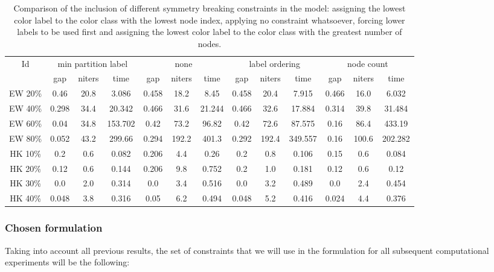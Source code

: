 \begin{sidewaystable}
\label{table:models:sym}
\centering

\begin{tabular}{|c|ccc|ccc|ccc|ccc|}
\hline
\multicolumn{1}{|c|}{Id} & \multicolumn{3}{|c|}{min partition label} & \multicolumn{3}{|c|}{none} & \multicolumn{3}{|c|}{label ordering} & \multicolumn{3}{|c|}{node count}
\\
 & gap & niters & time & gap & niters & time & gap & niters & time & gap & niters & time
\\
\hline
EW 20\% & 0.46 & 20.8 & 3.086 & 0.458 & 18.2 & 8.45 & 0.458 & 20.4 & 7.915 & 0.466 & 16.0 & 6.032
\\
EW 40\% & 0.298 & 34.4 & 20.342 & 0.466 & 31.6 & 21.244 & 0.466 & 32.6 & 17.884 & 0.314 & 39.8 & 31.484
\\
EW 60\% & 0.04 & 34.8 & 153.702 & 0.42 & 73.2 & 96.82 & 0.42 & 72.6 & 87.575 & 0.16 & 86.4 & 433.19
\\
EW 80\% & 0.052 & 43.2 & 299.66 & 0.294 & 192.2 & 401.3 & 0.292 & 192.4 & 349.557 & 0.16 & 100.6 & 202.282
\\
HK 10\% &  0.2 &  0.6 & 0.082 & 0.206 &  4.4 & 0.26 &  0.2 &  0.8 & 0.106 & 0.15 &  0.6 & 0.084
\\
HK 20\% & 0.12 &  0.6 & 0.144 & 0.206 &  9.8 & 0.752 &  0.2 &  1.0 & 0.181 & 0.12 &  0.6 & 0.12
\\
HK 30\% &  0.0 &  2.0 & 0.314 &  0.0 &  3.4 & 0.516 &  0.0 &  3.2 & 0.489 &  0.0 &  2.4 & 0.454
\\
HK 40\% & 0.048 &  3.8 & 0.316 & 0.05 &  6.2 & 0.494 & 0.048 &  5.2 & 0.416 & 0.024 &  4.4 & 0.376
\\
\hline 
 \end{tabular}

\caption{Comparison of the inclusion of different symmetry breaking constraints in the model: assigning the lowest color label to the color class with the lowest node index, applying no constraint whatsoever, forcing lower labels to be used first and assigning the lowest color label to the color class with the greatest number of nodes.}

\end{sidewaystable}

\subsubsection*{Chosen formulation}
\label{subsubsec:results:model:chosen}

Taking into account all previous results, the set of constraints that we will use in the \PCP{} formulation for all subsequent computational experiments will be the following:

